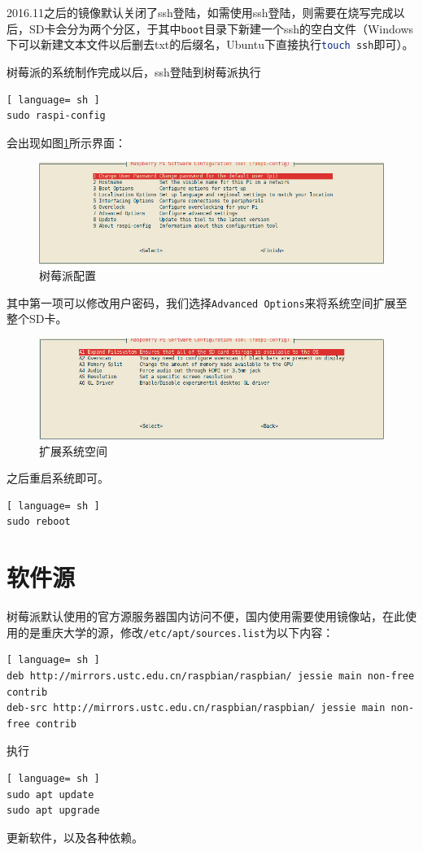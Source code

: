		\par 2016.11之后的镜像默认关闭了ssh登陆，如需使用ssh登陆，则需要在烧写完成以后，SD卡会分为两个分区，于其中\lstinline[language=sh]{boot}目录下新建一个ssh的空白文件（Windows下可以新建文本文件以后删去txt的后缀名，Ubuntu下直接执行\lstinline[language=sh]{touch ssh}即可）。
		\par 树莓派的系统制作完成以后，ssh登陆到树莓派执行
		\begin{lstlisting}[ language= sh ]
sudo raspi-config
		\end{lstlisting}
		\par 会出现如图\ref{fig:raspi_config}所示界面：
		\begin{figure}[htp]
			\centering
			\includegraphics[width=13cm]{figures/raspi-config.png}
			\caption{树莓派配置}
			\label{fig:raspi_config}
		\end{figure}
		\par 其中第一项可以修改用户密码，我们选择\lstinline{Advanced Options}来将系统空间扩展至整个SD卡。
		\begin{figure}[htp]
			\centering
			\includegraphics[width=13cm]{figures/raspi-config-expand-filesystem.png}
			\caption{扩展系统空间}
			\label{fig:raspi_config_expand_filesystem}
		\end{figure}
		\par 之后重启系统即可。
		\begin{lstlisting}[ language= sh ]
sudo reboot
		\end{lstlisting}
	\section{软件源}
		\par 树莓派默认使用的官方源服务器国内访问不便，国内使用需要使用镜像站，在此使用的是重庆大学的源，修改\lstinline[language=sh]{/etc/apt/sources.list}为以下内容：
		\begin{lstlisting}[ language= sh ]
deb http://mirrors.ustc.edu.cn/raspbian/raspbian/ jessie main non-free contrib 
deb-src http://mirrors.ustc.edu.cn/raspbian/raspbian/ jessie main non-free contrib
		\end{lstlisting}
		\par 执行
		\begin{lstlisting}[ language= sh ]
sudo apt update
sudo apt upgrade
		\end{lstlisting}
		\par 更新软件，以及各种依赖。
